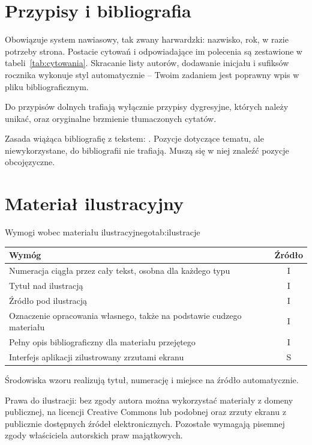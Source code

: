\section{Przypisy i bibliografia}

Obowiązuje system nawiasowy, tak zwany harwardzki: nazwisko, rok, w razie potrzeby strona. Postacie cytowań i odpowiadające im polecenia są zestawione w tabeli~\ref{tab:cytowania}. Skracanie listy autorów, dodawanie inicjału i sufiksów rocznika wykonuje styl automatycznie -- Twoim zadaniem jest poprawny wpis w pliku bibliograficznym.

Do przypisów dolnych trafiają wyłącznie przypisy dygresyjne, których należy unikać, oraz oryginalne brzmienie tłumaczonych cytatów.

Zasada wiążąca bibliografię z tekstem: . Pozycje dotyczące tematu, ale niewykorzystane, do bibliografii nie trafiają. Muszą się w niej znaleźć pozycje obcojęzyczne.

\section{Materiał ilustracyjny}

\begin{tabelaepi}{Wymogi wobec materiału ilustracyjnego}{tab:ilustracje}
\begin{tabular}{@{}p{10.6cm}c@{}}
\toprule
Wymóg & Źródło \\
\midrule
Numeracja ciągła przez cały tekst, osobna dla każdego typu & I \\
Tytuł nad ilustracją & I \\
Źródło pod ilustracją & I \\
Oznaczenie opracowania własnego, także na podstawie cudzego materiału & I \\
Pełny opis bibliograficzny dla materiału przejętego & I \\
Interfejs aplikacji zilustrowany zrzutami ekranu & S \\
\bottomrule
\end{tabular}
\end{tabelaepi}

Środowiska wzoru realizują tytuł, numerację i miejsce na źródło automatycznie.

Prawa do ilustracji: bez zgody autora można wykorzystać materiały z domeny publicznej, na licencji Creative Commons lub podobnej oraz zrzuty ekranu z publicznie dostępnych źródeł elektronicznych. Pozostałe wymagają pisemnej zgody właściciela autorskich praw majątkowych.

